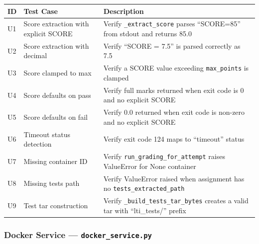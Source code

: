 \documentclass[12pt, letterpaper]{article}
\begin{document}
\begin{longtable}{p{0.5cm} p{4.5cm} p{8.5cm}}
    \toprule
    \textbf{ID} & \textbf{Test Case} & \textbf{Description} \\
    \midrule
    U1 & Score extraction with explicit SCORE & Verify \texttt{\_extract\_score} parses ``SCORE=85'' from stdout and returns 85.0 \\
    U2 & Score extraction with decimal & Verify ``SCORE = 7.5'' is parsed correctly as 7.5 \\
    U3 & Score clamped to max & Verify a SCORE value exceeding \texttt{max\_points} is clamped \\
    U4 & Score defaults on pass & Verify full marks returned when exit code is 0 and no explicit SCORE \\
    U5 & Score defaults on fail & Verify 0.0 returned when exit code is non-zero and no explicit SCORE \\
    U6 & Timeout status detection & Verify exit code 124 maps to ``timeout'' status \\
    U7 & Missing container ID & Verify \texttt{run\_grading\_for\_attempt} raises ValueError for None container \\
    U8 & Missing tests path & Verify ValueError raised when assignment has no \texttt{tests\_extracted\_path} \\
    U9 & Test tar construction & Verify \texttt{\_build\_tests\_tar\_bytes} creates a valid tar with ``lti\_tests/'' prefix \\
    \bottomrule
\end{longtable}

\subsubsection{Docker Service --- \texttt{docker\_service.py}}
\end{document}
